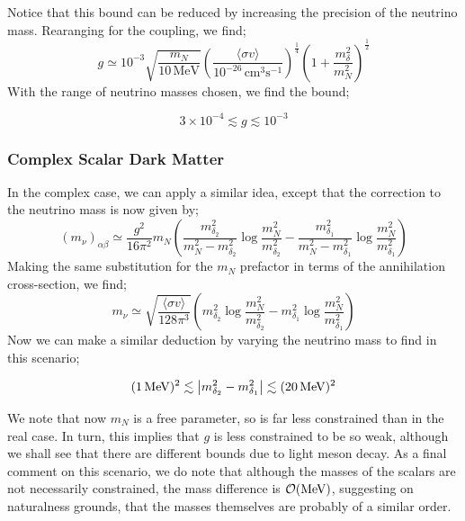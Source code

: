 \documentclass[10pt]{article}
\begin{document}
\noindent Notice that this bound can be reduced by increasing the precision of the neutrino mass. Rearanging for the coupling, we find;
\begin{equation}
  g \simeq 10^{-3}\sqrt{\frac{m_N}{10 \, \text{MeV}}}\left(\frac{\langle\sigma v\rangle}{10^{-26} \, \text{cm}^3 \text{s}^{-1}}\right)^{\frac{1}{4}}\left(1 + \frac{m_\delta^2}{m_N^2}\right)^{\frac{1}{2}}
\end{equation}
With the range of neutrino masses chosen, we find the bound;
\begin{framed}
\begin{equation}
3 \times 10^{-4} \lesssim g \lesssim 10^{-3}
\end{equation}
\end{framed}
\subsubsection*{Complex Scalar Dark Matter}
In the complex case, we can apply a similar idea, except that the correction to the neutrino mass is now given by;
\begin{equation}
  (m_\nu)_{\alpha\beta} \simeq \frac{g^2}{16\pi^2}m_{N}\left(\frac{m_{\delta_2}^2}{m_{N}^2 - m_{\delta_2}^2}\log\frac{m_{N}^2}{m_{\delta_2}^2} - \frac{m_{\delta_1}^2}{m_{N}^2 - m_{\delta_1}^2}\log\frac{m_{N}^2}{m_{\delta_1}^2}\right)
\end{equation}
Making the same substitution for the $m_N$ prefactor in terms of the annihilation cross-section, we find;
\begin{equation}
  m_\nu \simeq \sqrt{\frac{\langle \sigma v \rangle}{128\pi^3}}\left(m_{\delta_2}^2 \log\frac{m_{N}^2}{m_{\delta_2}^2} - m_{\delta_1}^2\log\frac{m_{N}^2}{m_{\delta_1}^2}\right)
\end{equation}
Now we can make a similar deduction by varying the neutrino mass to find in this scenario;
\begin{framed}
  \begin{equation}
    (1\, \text{MeV})^2 \lesssim \left| m_{\delta_2}^2 - m_{\delta_1}^2 \right| \lesssim (20 \, \text{MeV})^2
  \end{equation}
\end{framed}
\noindent We note that now $m_N$ is a free parameter, so is far less constrained than in the real case. In turn, this implies that $g$ is less constrained to be so weak, although we shall see that there are different bounds due to light meson decay. As a final comment on this scenario, we do note that although the masses of the scalars are not necessarily constrained, the mass difference is $\mathcal{O}(\text{MeV})$, suggesting on naturalness grounds, that the masses themselves are probably of a similar order.
\end{document}
